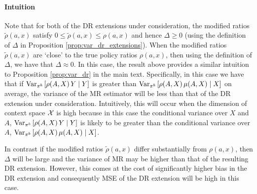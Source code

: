 \paragraph{Intuition}
Note that for both of the DR extensions under consideration, the modified ratios $\tilde{\rho}(a, x)$ satisfy $0\leq \tilde{\rho}(a, x)\leq \rho(a, x)$ and hence $\Delta \geq 0$ (using the definition of $\Delta$ in Proposition \ref{prop:var_dr_extensions}).
When the modified ratios $\tilde{\rho}(a, x)$ are `close' to the true policy ratios $\rho(a, x)$, then using the definition of $\Delta$, we have that $\Delta \approx 0$. In this case, the result above provides a similar intuition to Proposition \ref{prop:var_dr} in the main text. Specifically, in this case we have that if $\textup{Var}_{\pi^b}\left[ \rho(A, X)\,Y \mid Y \right]$ is greater than $\textup{Var}_{\pi^b}\left[ \rho(A, X)\,\mu(A, X) \mid X \right]$ on average, the variance of the MR estimator will be less than that of the DR extension under consideration. 
Intuitively, this will occur when the dimension of context space $\mathcal{X}$ is high because in this case the conditional variance over $X$ and $A$, $\textup{Var}_{\pi^b}\left[\rho(A, X)\,Y \mid Y \right]$ is likely to be greater than the conditional variance over $A$, $\textup{Var}_{\pi^b}\left[ \rho(A, X)\,\mu(A, X) \mid X \right]$.

In contrast if the modified ratios $\tilde{\rho}(a, x)$ differ substantially from $\rho(a, x)$, then $\Delta$ will be large and the variance of MR may be higher than that of the resulting DR extension. However, this comes at the cost of significantly higher bias in the DR extension and consequently MSE of the DR extension will be high in this case.
